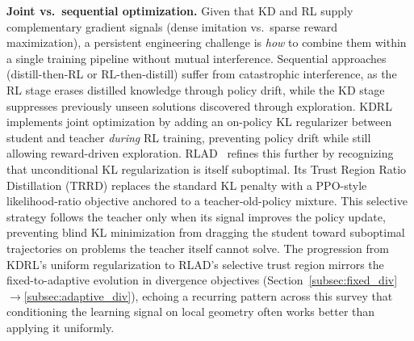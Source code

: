 \documentclass{article} %
\begin{document}
\textbf{Joint vs.\ sequential optimization.} Given that KD and RL supply complementary gradient signals (dense imitation vs.\ sparse reward maximization), a persistent engineering challenge is \emph{how} to combine them within a single training pipeline without mutual interference. Sequential approaches (distill-then-RL or RL-then-distill) suffer from catastrophic interference, as the RL stage erases distilled knowledge through policy drift, while the KD stage suppresses previously unseen solutions discovered through exploration. KDRL~\citep{2506.02208} implements joint optimization by adding an on-policy KL regularizer between student and teacher \emph{during} RL training, preventing policy drift while still allowing reward-driven exploration. RLAD~\citep{2602.22495} refines this further by recognizing that unconditional KL regularization is itself suboptimal. Its Trust Region Ratio Distillation (TRRD) replaces the standard KL penalty with a PPO-style likelihood-ratio objective anchored to a teacher-old-policy mixture. This selective strategy follows the teacher only when its signal improves the policy update, preventing blind KL minimization from dragging the student toward suboptimal trajectories on problems the teacher itself cannot solve. The progression from KDRL's uniform regularization to RLAD's selective trust region mirrors the fixed-to-adaptive evolution in divergence objectives (Section~\ref{subsec:fixed_div}$\to$\ref{subsec:adaptive_div}), echoing a recurring pattern across this survey that conditioning the learning signal on local geometry often works better than applying it uniformly.
\end{document}
